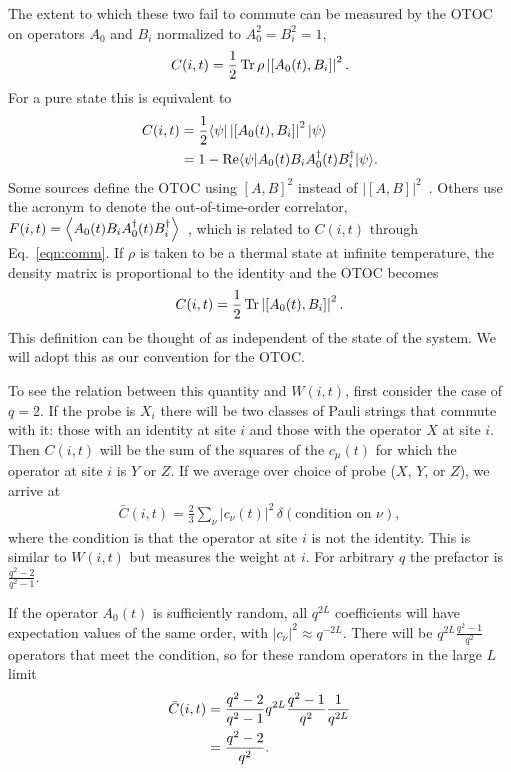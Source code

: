 The extent to which these two fail to commute can be measured by the OTOC on operators $A_0$ and $B_i$ normalized to $A_0^2=B_i^2=1$,
\begin{align}
C(i,t) = \frac{1}{2}\operatorname{Tr} \rho \left|[A_0(t),B_i]\right|^2.\nonumber
\end{align}
For a pure state this is equivalent to~\cite{Keyserlingk, Jonay18}
\begin{align}
C(i,t) &= \frac{1}{2}\langle\psi|\left|[A_0(t),B_i]\right|^2|\psi\rangle\nonumber\\
&= 1-\operatorname{Re}\langle\psi|A_0(t)B_iA_0^\dag(t)B_i^\dag|\psi\rangle. \label{eqn:comm}
\end{align}
Some sources define the OTOC using $[A,B]^2$ instead of $|[A,B]|^2$~\cite{Jonay, Roberts2016, Nahum2017}. Others use the acronym to denote the out-of-time-order correlator, $F(i,t) = \left\langle A_0(t)B_iA_0^\dag(t)B^\dag_i \right\rangle$~\cite{Who}, which is related to $C(i,t)$ through Eq.~\ref{eqn:comm}. If $\rho$ is taken to be a thermal state at infinite temperature, the density matrix is proportional to the identity and the OTOC becomes
\begin{align}
C(i,t) = \frac{1}{2}\operatorname{Tr} \left|[A_0(t),B_i]\right|^2.
\end{align}
This definition can be thought of as independent of the state of the system. We will adopt this as our convention for the OTOC.

To see the relation between this quantity and $W(i,t)$, first consider the case of $q=2$. If the probe is $X_i$ there will be two classes of Pauli strings that commute with it: those with an identity at site $i$ and those with the operator $X$ at site $i$. Then $C(i,t)$ will be the sum of the squares of the $c_\mu(t)$ for which the operator at site $i$ is $Y$ or $Z$. If we average over choice of probe ($X$, $Y$, or $Z$), we arrive at 
\begin{align}
\bar{C}(i,t) = \frac{2}{3}\sum_\nu|c_\nu(t)|^2\,\delta(\text{condition 
	on $\nu$}),\label{eqn:otoc}
\end{align}
where the condition is that the operator at site $i$ is not the identity. This is similar to $W(i,t)$ but measures the weight at $i$. For arbitrary $q$ the prefactor is $\frac{q^2-2}{q^2-1}$. 

If the operator $A_0(t)$ is sufficiently random, all $q^{2L}$ coefficients will have expectation values of the same order, with $|c_\nu|^2 \approx q^{-2L}$. There will be $q^{2L}\frac{q^2-1}{q^2}$ operators that meet the condition, so for these random operators in the large $L$ limit
\begin{align}
\bar{C}(i,t) &= \frac{q^2-2}{q^2-1}q^{2L}\frac{q^2-1}{q^2}\frac{1}{q^{2L}}\nonumber\\
&= \frac{q^2-2}{q^2}\nonumber.
\end{align}

